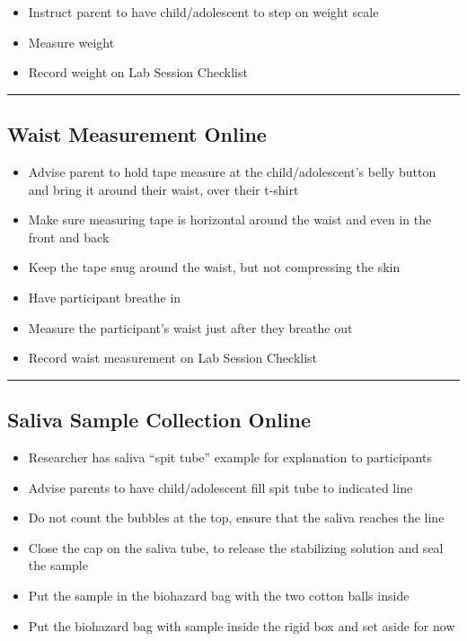 \documentclass[]{book}
\providecommand{\tightlist}{%
  \setlength{\itemsep}{0pt}\setlength{\parskip}{0pt}}
\begin{document}
\begin{itemize}
\tightlist
\item
  Instruct parent to have child/adolescent to step on weight scale
\item
  Measure weight
\item
  Record weight on Lab Session Checklist
\end{itemize}

\begin{center}\rule{0.5\linewidth}{0.5pt}\end{center}

\hypertarget{waist-measurement-online}{%
\subsection{Waist Measurement Online}\label{waist-measurement-online}}

\begin{itemize}
\tightlist
\item
  Advise parent to hold tape measure at the child/adolescent's belly button and bring it around their waist, over their t-shirt
\item
  Make sure measuring tape is horizontal around the waist and even in the front and back
\item
  Keep the tape snug around the waist, but not compressing the skin
\item
  Have participant breathe in
\item
  Measure the participant's waist just after they breathe out
\item
  Record waist measurement on Lab Session Checklist
\end{itemize}

\begin{center}\rule{0.5\linewidth}{0.5pt}\end{center}

\hypertarget{saliva-sample-collection-online}{%
\subsection{Saliva Sample Collection Online}\label{saliva-sample-collection-online}}

\begin{itemize}
\tightlist
\item
  Researcher has saliva ``spit tube'' example for explanation to participants
\item
  Advise parents to have child/adolescent fill spit tube to indicated line
\item
  Do not count the bubbles at the top, ensure that the saliva reaches the line
\item
  Close the cap on the saliva tube, to release the stabilizing solution and seal the sample
\item
  Put the sample in the biohazard bag with the two cotton balls inside
\item
  Put the biohazard bag with sample inside the rigid box and set aside for now
\end{itemize}
\end{document}
